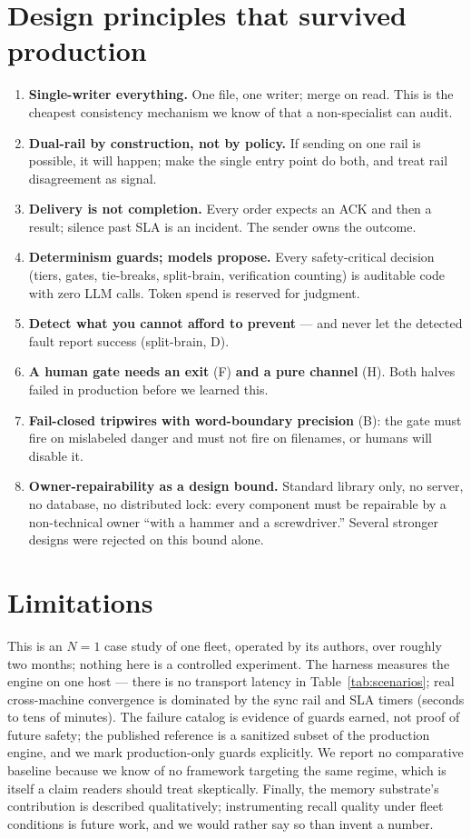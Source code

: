 \documentclass[11pt]{article}
\begin{document}
\section{Design principles that survived production}\label{sec:principles}
\begin{enumerate}
\item \textbf{Single-writer everything.} One file, one writer; merge on read. This is the cheapest consistency mechanism we know of that a non-specialist can audit.
\item \textbf{Dual-rail by construction, not by policy.} If sending on one rail is possible, it will happen; make the single entry point do both, and treat rail disagreement as signal.
\item \textbf{Delivery is not completion.} Every order expects an ACK and then a result; silence past SLA is an incident. The sender owns the outcome.
\item \textbf{Determinism guards; models propose.} Every safety-critical decision (tiers, gates, tie-breaks, split-brain, verification counting) is auditable code with zero LLM calls. Token spend is reserved for judgment.
\item \textbf{Detect what you cannot afford to prevent} --- and never let the detected fault report success (split-brain, D).
\item \textbf{A human gate needs an exit} (F) \textbf{and a pure channel} (H). Both halves failed in production before we learned this.
\item \textbf{Fail-closed tripwires with word-boundary precision} (B): the gate must fire on mislabeled danger and must not fire on filenames, or humans will disable it.
\item \textbf{Owner-repairability as a design bound.} Standard library only, no server, no database, no distributed lock: every component must be repairable by a non-technical owner ``with a hammer and a screwdriver.'' Several stronger designs were rejected on this bound alone.
\end{enumerate}

\section{Limitations}\label{sec:limits}
This is an $N{=}1$ case study of one fleet, operated by its authors, over roughly two months; nothing here is a controlled experiment. The harness measures the engine on one host --- there is no transport latency in Table~\ref{tab:scenarios}; real cross-machine convergence is dominated by the sync rail and SLA timers (seconds to tens of minutes). The failure catalog is evidence of guards earned, not proof of future safety; the published reference is a sanitized subset of the production engine, and we mark production-only guards explicitly. We report no comparative baseline because we know of no framework targeting the same regime, which is itself a claim readers should treat skeptically. Finally, the memory substrate's contribution is described qualitatively; instrumenting recall quality under fleet conditions is future work, and we would rather say so than invent a number.
\end{document}
